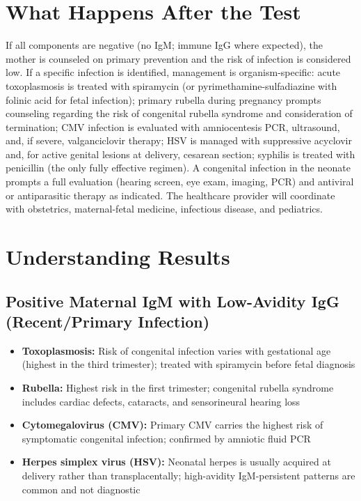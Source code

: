 \section*{What Happens After the Test}
If all components are negative (no IgM; immune IgG where expected), the mother is counseled on primary prevention and the risk of infection is considered low. If a specific infection is identified, management is organism-specific: acute toxoplasmosis is treated with spiramycin (or pyrimethamine-sulfadiazine with folinic acid for fetal infection); primary rubella during pregnancy prompts counseling regarding the risk of congenital rubella syndrome and consideration of termination; CMV infection is evaluated with amniocentesis PCR, ultrasound, and, if severe, valganciclovir therapy; HSV is managed with suppressive acyclovir and, for active genital lesions at delivery, cesarean section; syphilis is treated with penicillin (the only fully effective regimen). A congenital infection in the neonate prompts a full evaluation (hearing screen, eye exam, imaging, PCR) and antiviral or antiparasitic therapy as indicated. The healthcare provider will coordinate with obstetrics, maternal-fetal medicine, infectious disease, and pediatrics.

\section*{Understanding Results}

\subsection*{Positive Maternal IgM with Low-Avidity IgG (Recent/Primary Infection)}
\begin{itemize}
  \item \textbf{Toxoplasmosis:} Risk of congenital infection varies with gestational age (highest in the third trimester); treated with spiramycin before fetal diagnosis
  \item \textbf{Rubella:} Highest risk in the first trimester; congenital rubella syndrome includes cardiac defects, cataracts, and sensorineural hearing loss
  \item \textbf{Cytomegalovirus (CMV):} Primary CMV carries the highest risk of symptomatic congenital infection; confirmed by amniotic fluid PCR
  \item \textbf{Herpes simplex virus (HSV):} Neonatal herpes is usually acquired at delivery rather than transplacentally; high-avidity IgM-persistent patterns are common and not diagnostic
\end{itemize}

